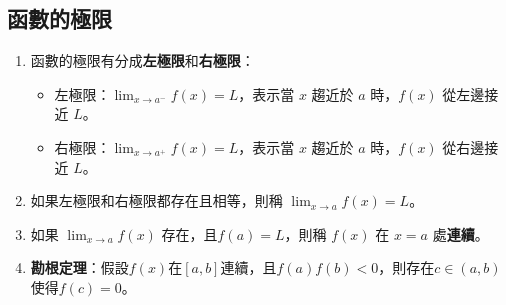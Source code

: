 \documentclass[12pt]{article}
\begin{document}
\begin{tcolorbox}[colframe=black!60!blue, colback=blue!5!white, arc=4pt, boxrule=1pt]
\section{函數的極限}
\begin{enumerate}
    \item 函數的極限有分成\textbf{左極限}和\textbf{右極限}：
    \begin{itemize}
        \item 左極限：$\displaystyle\lim_{x \to a^-} f(x) = L$，表示當 $x$ 趨近於 $a$ 時，$f(x)$ 從左邊接近 $L$。
        \item 右極限：$\displaystyle\lim_{x \to a^+} f(x) = L$，表示當 $x$ 趨近於 $a$ 時，$f(x)$ 從右邊接近 $L$。
    \end{itemize}
    \item 如果左極限和右極限都存在且相等，則稱 $\displaystyle\lim_{x \to a} f(x) = L$。
    \item 如果 $\displaystyle\lim_{x \to a} f(x)$ 存在，且$\displaystyle f(a) = L$，則稱 $f(x)$ 在 $x=a$ 處\textbf{連續}。
    \item \textbf{勘根定理}：假設$f(x)$在$[a, b]$連續，且$f(a)f(b) < 0$，則存在$c \in (a, b)$使得$f(c) = 0$。
\end{enumerate}

\end{tcolorbox}
\end{document}
